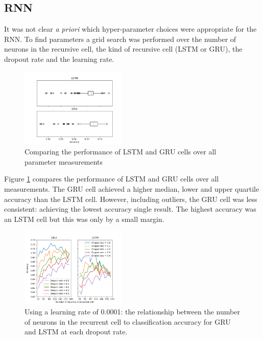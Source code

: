   \subsection{RNN}
  \label{sec:rnn_grid_search}

    It was not clear \textit{a priori} which hyper-parameter choices were
    appropriate for the RNN. To find parameters a grid search was performed over
    the number of neurons in the recursive cell, the kind of recursive cell
    (LSTM or GRU), the dropout rate and the learning rate.

    \begin{figure}[ht]
      \includegraphics[width=0.45\textwidth]{Figures/lstm_gru_plot.png}
      \caption{Comparing the performance of LSTM and GRU cells over all
        parameter measurements}
      \label{fig:lstm_gru}
    \end{figure}

    Figure \ref{fig:lstm_gru} compares the performance of LSTM and GRU cells
    over all measurements. The GRU cell achieved a higher
    median, lower and upper quartile accuracy than the LSTM cell. However, including
    outliers, the GRU cell was less consistent: achieving the lowest accuracy
    single result. The highest accuracy was an LSTM cell but this was only by a
    small margin.

    \begin{figure}[ht]
      \includegraphics[width=0.45\textwidth]{Figures/n_neurons_plot-0-0001.png}
      \caption{Using a learning rate of 0.0001: the relationship between the number of neurons in the recurrent
        cell to classification accuracy for GRU and LSTM at each dropout rate.}
      \label{fig:learn_rate_0.0001}
    \end{figure}

